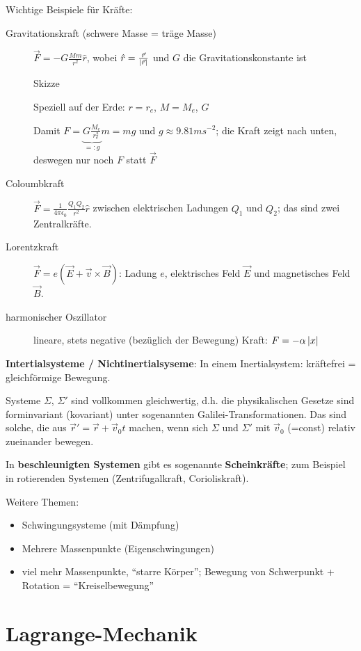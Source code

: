 Wichtige Beispiele für Kräfte:

\begin{description}
	\item[Gravitationskraft (schwere Masse = träge Masse)] $\vec{F} = -G \frac{M m}{r^2} \hat{r}$, wobei $\hat{r} = \frac{\vec{r}}{\left\lvert \vec{r} \right\rvert}$ und $G$ die Gravitationskonstante ist
	
		Skizze
	
		Speziell auf der Erde: $r = r_e$, $M = M_e$, $G$
		
		Damit $F = \underbrace{G \frac{M_e}{r_e^2}}_{=: g} m = mg$ und $g \approx 9.81 m s^{-2}$; die Kraft zeigt nach unten, deswegen nur noch $F$ statt $\vec{F}$
	\item[Coloumbkraft] $\vec{F} = \frac{1}{4 \pi \epsilon_0} \frac{Q_1 Q_2}{r^2} \hat{r}$ zwischen elektrischen Ladungen $Q_1$ und $Q_2$; das sind zwei Zentralkräfte.
	\item[Lorentzkraft] $\vec{F} = e (\vec{E} + \vec{v} \times \vec{B})$: Ladung $e$, elektrisches Feld $\vec{E}$ und magnetisches Feld $\vec{B}$.
	\item[harmonischer Oszillator] lineare, stets negative (bezüglich der Bewegung) Kraft: $F = -\alpha \left\lvert x \right\rvert$
\end{description}

\textbf{Intertialsysteme / Nichtinertialsyseme}: In einem Inertialsystem: kräftefrei = gleichförmige Bewegung. 

Systeme $\Sigma$, $\Sigma'$ sind vollkommen gleichwertig, d.h. die physikalischen Gesetze sind forminvariant (kovariant) unter sogenannten Galilei-Transformationen. Das sind solche, die aus $\vec{r}' = \vec{r} + \vec{v}_0t$ machen, wenn sich $\Sigma$ und $\Sigma'$ mit $\vec{v}_0$ (=const) relativ zueinander bewegen. 

In \textbf{beschleunigten Systemen} gibt es sogenannte \textbf{Scheinkräfte};  zum Beispiel in rotierenden Systemen (Zentrifugalkraft, Corioliskraft).

Weitere Themen:
\begin{itemize}
	\item Schwingungsysteme (mit Dämpfung)
	\item Mehrere Massenpunkte (Eigenschwingungen)
	\item viel mehr Massenpunkte, "`starre Körper"'; Bewegung von Schwerpunkt + Rotation = "`Kreiselbewegung"'
\end{itemize}

\section{Lagrange-Mechanik}

